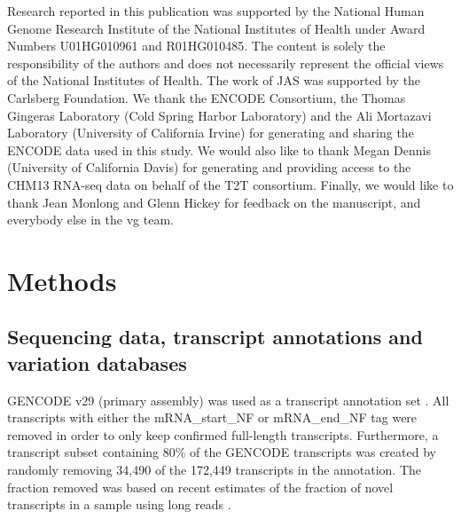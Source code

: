 \documentclass[11pt]{ucthesis}
\begin{document}
Research reported in this publication was supported by the National Human Genome Research Institute of the National Institutes of Health under Award Numbers U01HG010961 and R01HG010485. The content is solely the responsibility of the authors and does not necessarily represent the official views of the National Institutes of Health. The work of JAS was supported by the Carlsberg Foundation. We thank the ENCODE Consortium, the Thomas Gingeras Laboratory (Cold Spring Harbor Laboratory) and the Ali Mortazavi Laboratory (University of California Irvine) for generating and sharing the ENCODE data used in this study. We would also like to thank Megan Dennis (University of California Davis) for generating and providing access to the CHM13 RNA-seq data on behalf of the T2T consortium. Finally, we would like to thank Jean Monlong and Glenn Hickey for feedback on the manuscript, and everybody else in the vg team.

\section{Methods}

\subsection{Sequencing data, transcript annotations and variation databases}

GENCODE v29 (primary assembly) was used as a transcript annotation set \cite{frankish2019gencode}. All transcripts with either the mRNA\_start\_NF or mRNA\_end\_NF tag were removed in order to only keep confirmed full-length transcripts. Furthermore, a transcript subset containing 80\% of the GENCODE transcripts was created by randomly removing 34,490 of the 172,449 transcripts in the annotation. The fraction removed was based on recent estimates of the fraction of novel transcripts in a sample using long reads \cite{wyman2019technology}.
\end{document}
